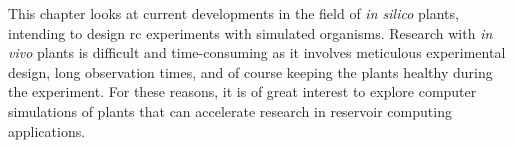 This chapter looks at current developments in the field of \textit{in silico} plants, intending to design \acrshort{rc} experiments with simulated organisms.
Research with \textit{in vivo} plants is difficult and time-consuming as it involves meticulous experimental design, long observation times, and of course keeping the plants healthy during the experiment\citep{pieters_plants_2021}.
For these reasons, it is of great interest to explore computer simulations of plants that can accelerate research in reservoir computing applications.
